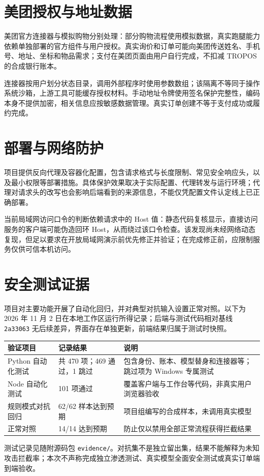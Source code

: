 \documentclass[journal,wp,nowatermark,nobib,clean]{paper}
\newcommand{\code}[1]{{\small\nolinkurl{#1}}}
\begin{document}
\section{美团授权与地址数据}
美团官方连接器与模拟购物分别处理：部分购物流程使用模拟数据，真实跑腿能力依赖单独部署的官方组件与用户授权。真实询价和订单可能向美团传送姓名、手机号、地址、坐标和物品需求；支付在美团页面由用户自行完成，不扣减 TROPOS 的合成银行账本。

连接器按用户划分状态目录，调用外部程序时使用参数数组；该隔离不等同于操作系统沙箱，上游工具可能缓存授权材料。手动地址令牌使用签名保护完整性，编码本身不提供加密，相关信息应按敏感数据管理。真实订单创建不等于支付成功或履约完成。

\section{部署与网络防护}
项目提供反向代理及容器化配置，包含请求格式与长度限制、常见安全响应头，以及最小权限等部署措施。具体保护效果取决于实际配置、代理转发与运行环境；代理对请求头的改写也会影响后端看到的来源信息，不能仅凭配置文件认定线上已正确部署。

当前局域网访问口令的判断依赖请求中的 Host 值：静态代码复核显示，直接访问服务的客户端可能伪造回环 Host，从而绕过该口令检查。该发现尚未经网络动态复现，但足以要求在开放局域网演示前优先修正并验证；在完成修正前，应限制服务仅供可信本机访问。

\section{安全测试证据}\label{sec:tests}
项目对主要功能开展了自动化回归，并对典型对抗输入设置正常对照。以下为 2026 年 11 月 2 日在本地工作区运行所得记录；后端与测试代码相对基线 \code{2a33063} 无后续差异，界面存在单独更新，前端结果归属于测试时快照。
\begin{longtable}{L{.27\textwidth}L{.26\textwidth}L{.34\textwidth}}
\toprule 验证项目 & 记录结果 & 说明 \\\midrule\endhead
Python 自动化测试 & 共 470 项；469 通过，1 跳过 & 包含身份、账本、模型替身和连接器等；跳过项为 Windows 专属测试 \\
Node 自动化测试 & 101 项通过 & 覆盖客户端与工作台等代码，非真实用户浏览器验收 \\
规则模式对抗回归 & 62/62 样本达到预期 & 项目组编写的合成样本，未调用真实模型 \\
正常对照 & 14/14 达到预期 & 防止仅以禁用全部正常流程获得拦截结果 \\\bottomrule
\end{longtable}
测试记录见随附源码包 \code{evidence/}。对抗集不是独立留出集，结果不能解释为未知攻击拦截率；本次不声称完成独立渗透测试、真实模型全面安全测试或真实订单端到端验收。
\end{document}
